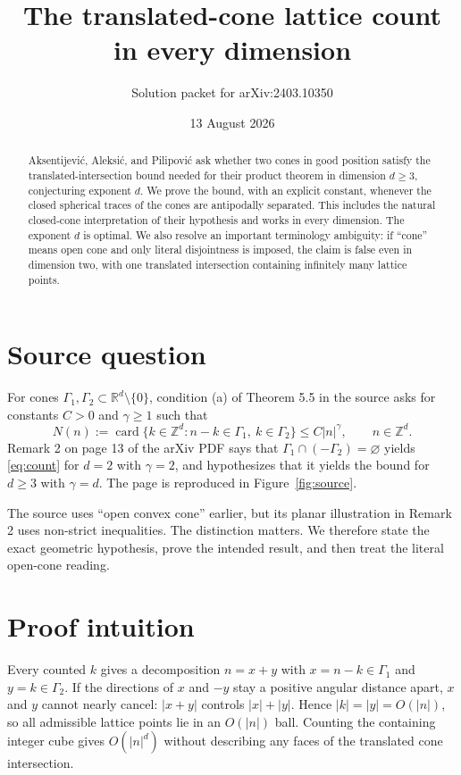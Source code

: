 \documentclass[11pt]{article}
\title{The translated-cone lattice count in every dimension}
\author{Solution packet for arXiv:2403.10350}
\date{13 August 2026}
\newcommand{\R}{\mathbb R}
\newcommand{\Z}{\mathbb Z}
\newcommand{\card}{\operatorname{card}}
\begin{document}
\maketitle

\begin{abstract}
Aksentijevi\'c, Aleksi\'c, and Pilipovi\'c ask whether two cones in good
position satisfy the translated-intersection bound needed for their product
theorem in dimension $d\ge3$, conjecturing exponent $d$.  We prove the bound,
with an explicit constant, whenever the closed spherical traces of the cones
are antipodally separated.  This includes the natural closed-cone
interpretation of their hypothesis and works in every dimension.  The exponent
$d$ is optimal.  We also resolve an important terminology ambiguity: if
``cone'' means open cone and only literal disjointness is imposed, the claim is
false even in dimension two, with one translated intersection containing
infinitely many lattice points.
\end{abstract}

\section{Source question}

For cones $\Gamma_1,\Gamma_2\subset\R^d\setminus\{0\}$, condition (a) of
Theorem 5.5 in the source asks for constants $C>0$ and $\gamma\ge1$ such that
\begin{equation}\label{eq:count}
 N(n):=\card\{k\in\Z^d:n-k\in\Gamma_1,\ k\in\Gamma_2\}
 \le C|n|^\gamma,\qquad n\in\Z^d.
\end{equation}
Remark 2 on page 13 of the arXiv PDF says that
$\Gamma_1\cap(-\Gamma_2)=\varnothing$ yields \eqref{eq:count} for $d=2$
with $\gamma=2$, and hypothesizes that it yields the bound for $d\ge3$ with
$\gamma=d$.  The page is reproduced in Figure~\ref{fig:source}.

The source uses ``open convex cone'' earlier, but its planar illustration in
Remark 2 uses non-strict inequalities.  The distinction matters.  We therefore
state the exact geometric hypothesis, prove the intended result, and then
treat the literal open-cone reading.

\section{Proof intuition}

Every counted $k$ gives a decomposition $n=x+y$ with
$x=n-k\in\Gamma_1$ and $y=k\in\Gamma_2$.  If the directions of $x$ and
$-y$ stay a positive angular distance apart, $x$ and $y$ cannot nearly cancel:
$|x+y|$ controls $|x|+|y|$.  Hence $|k|=|y|=O(|n|)$, so all admissible lattice
points lie in an $O(|n|)$ ball.  Counting the containing integer cube gives
$O(|n|^d)$ without describing any faces of the translated cone intersection.
\end{document}
